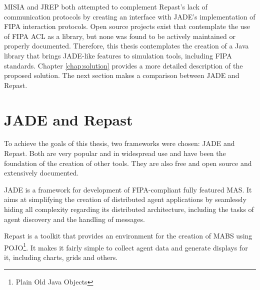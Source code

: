 MISIA and JREP both attempted to complement Repast's lack of communication protocols by creating an interface with JADE's implementation of FIPA interaction protocols. Open source projects exist that contemplate the use of FIPA ACL as a library, but none was found to be actively maintained or properly documented. Therefore, this thesis contemplates the creation of a Java library that brings JADE-like features to simulation tools, including FIPA standards. Chapter \ref{chap:solution} provides a more detailed description of the proposed solution. The next section makes a comparison between JADE and Repast.

\section{JADE and Repast}

To achieve the goals of this thesis, two frameworks were chosen: JADE and Repast. Both are very popular and in widespread use and have been the foundation of the creation of other tools. They are also free and open source and extensively documented.

JADE is a framework for development of FIPA-compliant fully featured MAS. It aims at simplifying the creation of distributed agent applications by seamlessly hiding all complexity regarding its distributed architecture, including the tasks of agent discovery and the handling of messages.

Repast is a toolkit that provides an environment for the creation of MABS using POJO\footnote{Plain Old Java Objects}. It makes it fairly simple to collect agent data and generate displays for it, including charts, grids and others.

